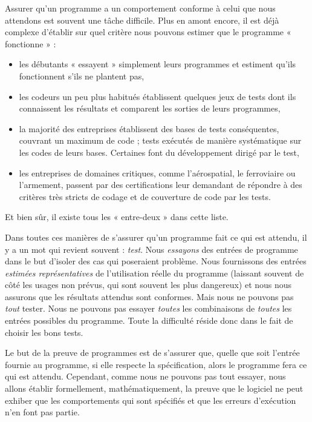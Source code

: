 \documentclass[12pt,francais,]{scrbook}
\providecommand{\tightlist}{%
  \setlength{\itemsep}{0pt}\setlength{\parskip}{0pt}}
\begin{document}
Assurer qu'un programme a un comportement conforme à celui que nous
attendons est souvent une tâche difficile. Plus en amont encore, il est
déjà complexe d'établir sur quel critère nous pouvons estimer que le
programme « fonctionne » :

\begin{itemize}
\tightlist
\item
  les débutants « essayent » simplement leurs programmes et estiment
  qu'ils fonctionnent s'ils ne plantent pas,
\item
  les codeurs un peu plus habitués établissent quelques jeux de tests
  dont ils connaissent les résultats et comparent les sorties de leurs
  programmes,
\item
  la majorité des entreprises établissent des bases de tests
  conséquentes, couvrant un maximum de code ; tests exécutés de manière
  systématique sur les codes de leurs bases. Certaines font du
  développement dirigé par le test,
\item
  les entreprises de domaines critiques, comme l'aérospatial, le
  ferroviaire ou l'armement, passent par des certifications leur
  demandant de répondre à des critères très stricts de codage et de
  couverture de code par les tests.
\end{itemize}

Et bien sûr, il existe tous les « entre-deux » dans cette liste.

Dans toutes ces manières de s'assurer qu'un programme fait ce qui est
attendu, il y a un mot qui revient souvent : \emph{test}. Nous
\emph{essayons} des entrées de programme dans le but d'isoler des cas
qui poseraient problème. Nous fournissons des entrées \emph{estimées
représentatives} de l'utilisation réelle du programme (laissant souvent
de côté les usages non prévus, qui sont souvent les plus dangereux) 
et nous nous
assurons que les résultats attendus sont conformes. Mais nous ne pouvons
pas \emph{tout} tester. Nous ne pouvons pas essayer \emph{toutes} les
combinaisons de \emph{toutes} les entrées possibles du programme. Toute
la difficulté réside donc dans le fait de choisir les bons tests.

Le but de la preuve de programmes est de s'assurer que, quelle que soit
l'entrée fournie au programme, si elle respecte la spécification, alors
le programme fera ce qui est attendu. Cependant, comme nous ne pouvons
pas tout essayer, nous allons établir formellement, mathématiquement, la
preuve que le logiciel ne peut exhiber que les comportements qui sont
spécifiés et que les erreurs d'exécution n'en font pas partie.
\end{document}

